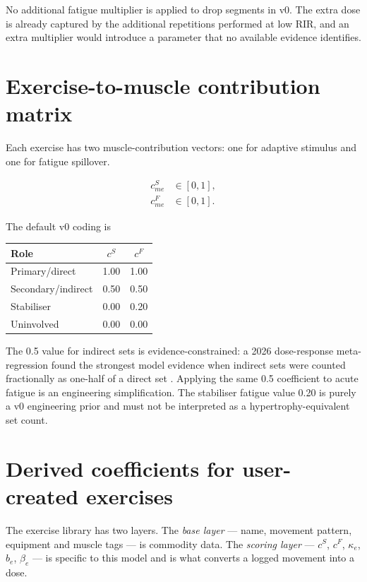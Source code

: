 \documentclass[11pt]{article}
\begin{document}
No additional fatigue multiplier is applied to drop segments in v0. The extra dose is already captured by the additional repetitions performed at low RIR, and an extra multiplier would introduce a parameter that no available evidence identifies.

\section{Exercise-to-muscle contribution matrix}
\label{sec:contrib}

Each exercise has two muscle-contribution vectors: one for adaptive stimulus and one for fatigue spillover.

\begin{align}
c^{S}_{me} &\in [0,1],\\
c^{F}_{me} &\in [0,1].
\end{align}

The default v0 coding is

\begin{center}
\begin{tabular}{lcc}
\toprule
Role & $c^S$ & $c^F$ \\
\midrule
Primary/direct & 1.00 & 1.00 \\
Secondary/indirect & 0.50 & 0.50 \\
Stabiliser & 0.00 & 0.20 \\
Uninvolved & 0.00 & 0.00 \\
\bottomrule
\end{tabular}
\end{center}

The 0.5 value for indirect sets is evidence-constrained: a 2026 dose-response meta-regression found the strongest model evidence when indirect sets were counted fractionally as one-half of a direct set \cite{pelland2026}. Applying the same 0.5 coefficient to acute fatigue is an engineering simplification. The stabiliser fatigue value 0.20 is purely a v0 engineering prior and must not be interpreted as a hypertrophy-equivalent set count.

\section{Derived coefficients for user-created exercises}
\label{sec:derived}

The exercise library has two layers. The \emph{base layer} --- name, movement pattern, equipment and muscle tags --- is commodity data. The \emph{scoring layer} --- $c^S$, $c^F$, $\kappa_e$, $b_e$, $\beta_e$ --- is specific to this model and is what converts a logged movement into a dose.
\end{document}
